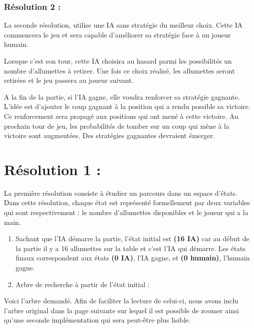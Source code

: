 \documentclass[
]{article}
\begin{document}
\hypertarget{ruxe9solution-2}{%
\subsubsection{Résolution 2 :}\label{ruxe9solution-2}}

La seconde résolution, utilise une IA sans stratégie du meilleur choix.
Cette IA commencera le jeu et sera capable d'améliorer sa stratégie face
à un joueur humain.

Lorsque c'est son tour, cette IA choisira au hasard parmi les
possibilités un nombre d'allumettes à retirer. Une fois ce choix
réalisé, les allumettes seront retirées et le jeu passera au joueur
suivant.

A la fin de la partie, si l'IA gagne, elle voudra renforcer sa stratégie
gagnante. L'idée est d'ajouter le coup gagnant à la position qui a rendu
possible sa victoire. Ce renforcement sera propagé aux positions qui ont
mené à cette victoire. Au prochain tour de jeu, les probabilités de
tomber sur un coup qui mène à la victoire sont augmentées. Des
stratégies gagnantes devraient émerger.

\pagebreak

\hypertarget{ruxe9solution-1-1}{%
\section{Résolution 1 :}\label{ruxe9solution-1-1}}

La première résolution consiste à étudier un parcours dans un espace
d'états. Dans cette résolution, chaque état est représenté formellement
par deux variables qui sont respectivement : le nombre d'allumettes
disponibles et le joueur qui a la main.

\begin{enumerate}
\def\labelenumi{\arabic{enumi}.}
\item
  Sachant que l'IA démarre la partie, l'état initial est \textbf{(16
  IA)} car au début de la partie il y a 16 allumettes sur la table et
  c'est l'IA qui démarre. Les états finaux correspondent aux états
  \textbf{(0 IA)}, l'IA gagne, et \textbf{(0 humain)}, l'humain gagne.
\item
  Arbre de recherche à partir de l'état initial :
\end{enumerate}

Voici l'arbre demandé. Afin de faciliter la lecture de celui-ci, nous avons
inclu l'arbre original dans la page suivante sur lequel il est possible de zoomer ainsi qu'une seconde 
implémentation qui sera peut-être plus lisible.
\end{document}
